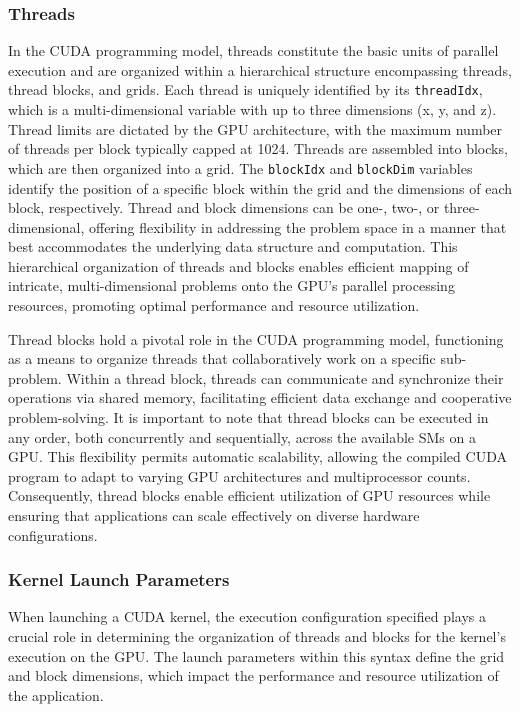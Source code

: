 \subsubsection{Threads}
\label{sec:threads}
In the CUDA programming model, threads constitute the basic units of parallel execution and are 
organized within a hierarchical structure encompassing threads, thread blocks, and grids. Each 
thread is uniquely identified by its \texttt{threadIdx}, which is a multi-dimensional variable with up to 
three dimensions (x, y, and z)\cite{cuda2016best}. Thread limits are dictated by the GPU architecture, with the 
maximum number of threads per block typically capped at 1024. Threads are assembled into blocks, 
which are then organized into a grid. The \texttt{blockIdx} and \texttt{blockDim} variables identify the position 
of a specific block within the grid and the dimensions of each block, respectively. Thread and 
block dimensions can be one-, two-, or three-dimensional, offering flexibility in addressing the 
problem space in a manner that best accommodates the underlying data structure and computation. 
This hierarchical organization of threads and blocks enables efficient mapping of intricate, 
multi-dimensional problems onto the GPU's parallel processing resources, promoting optimal 
performance and resource utilization.

Thread blocks hold a pivotal role in the CUDA programming model\cite{marccudaslides}, functioning as a means to 
organize threads that collaboratively work on a specific sub-problem. Within a thread block, 
threads can communicate and synchronize their operations via shared memory, facilitating efficient 
data exchange and cooperative problem-solving. It is important to note that thread blocks can be 
executed in any order, both concurrently and sequentially, across the available SMs on a GPU. This 
flexibility permits automatic scalability, allowing the compiled CUDA program to adapt to varying 
GPU architectures and multiprocessor counts\cite{cuda2016best}. Consequently, thread blocks enable efficient utilization 
of GPU resources while ensuring that applications can scale effectively on diverse hardware configurations.

\subsubsection{Kernel Launch Parameters}
\label{sec:kernellaunchparameters}

When launching a CUDA kernel, the execution configuration specified plays a crucial role in determining 
the organization of threads and blocks for the kernel's execution on the GPU. The launch parameters 
within this syntax define the grid and block dimensions, which impact the performance and resource 
utilization of the application.


